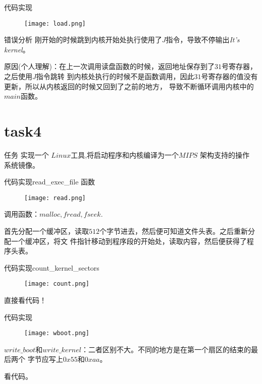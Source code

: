 \documentclass{beamer}
\begin{document}
\begin{frame}{代码实现}
\begin{figure}
	
	\centering\texttt{[image: load.png]}
\end{figure}
\end{frame}

\begin{frame}{错误分析}
刚开始的时候跳到内核开始处执行使用了$J$指令，导致不停输出\emph{It's kernel}。

原因(个人理解)：在上一次调用读盘函数的时候，返回地址保存到了$31$号寄存器，之后使用$J$指令跳转
到内核处执行的时候不是函数调用，因此$31$号寄存器的值没有更新，所以从内核返回的时候又回到了之前的地方，
导致不断循环调用内核中的$main$函数。
\end{frame}

\section{task4}
\begin{frame}{任务}
实现一个 $Linux$工具,将启动程序和内核编译为一个$ MIPS$ 架构支持的操作
系统镜像。
	
\end{frame}

\begin{frame}{代码实现}{read\_exec\_file 函数}
\begin{figure}
	
	\centering\texttt{[image: read.png]}
\end{figure}
调用函数：$malloc, fread, fseek$.

首先分配一个缓冲区，读取$512$个字节进去，然后便可知道文件头表。之后重新分配一个缓冲区，将文
件指针移动到程序段的开始处，读取内容，然后便获得了程序头表。
\end{frame}

\begin{frame}{代码实现}{count\_kernel\_sectors}
\begin{figure}
	
	\centering\texttt{[image: count.png]}
\end{figure}
直接看代码！

\end{frame}

\begin{frame}{代码实现}

\begin{figure}
	
	\centering\texttt{[image: wboot.png]}
\end{figure}
$write\_boot$和$write\_kernel$：二者区别不大。不同的地方是在第一个扇区的结束的最后两个
字节应写上$0x55$和$0xaa$。

看代码。
\end{frame}
\end{document}
